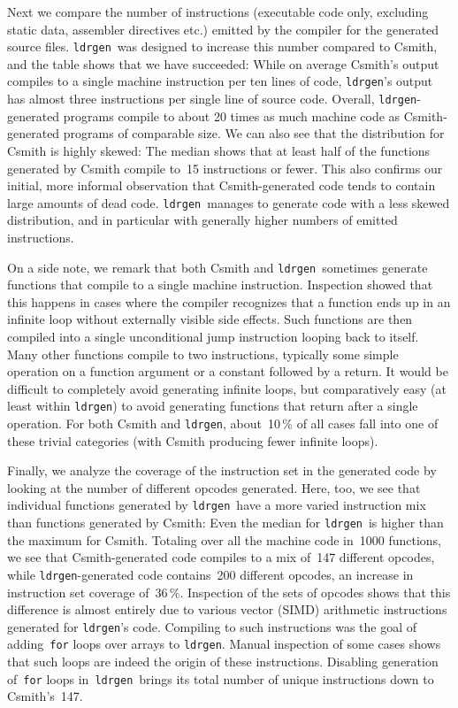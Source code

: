 \documentclass{llncs}
\newcommand\ldrgen{\texttt{ldrgen}}
\begin{document}
Next we compare the number of instructions (executable code only, excluding
static data, assembler directives etc.) emitted by the compiler for the
generated source files. \ldrgen\ was designed to increase this number
compared to Csmith, and the table shows that we have succeeded: While on
average Csmith's output compiles to a single machine instruction per ten
lines of code, \ldrgen's output has almost three instructions per single
line of source code. Overall, \ldrgen-generated programs compile to about 20
times as much machine code as Csmith-generated programs of comparable size.
We can also see that the distribution for Csmith is highly skewed: The
median shows that at least half of the functions generated by Csmith compile
to~15 instructions or fewer. This also confirms our initial, more informal
observation that Csmith-generated code tends to contain large amounts of
dead code. \ldrgen\ manages to generate code with a less skewed
distribution, and in particular with generally higher numbers of emitted
instructions.

On a side note, we remark that both Csmith and \ldrgen\ sometimes generate
functions that compile to a single machine instruction. Inspection showed
that this happens in cases where the compiler recognizes that a function
ends up in an infinite loop without externally visible side effects. Such
functions are then compiled into a single unconditional jump instruction
looping back to itself. Many other functions compile to two instructions,
typically some simple operation on a function argument or a constant
followed by a return. It would be difficult to completely avoid generating
infinite loops, but comparatively easy (at least within \ldrgen) to avoid
generating functions that return after a single operation. For both Csmith
and \ldrgen, about~10\,\% of all cases fall into one of these trivial
categories (with Csmith producing fewer infinite loops).

Finally, we analyze the coverage of the instruction set in the generated
code by looking at the number of different opcodes generated. Here, too, we
see that individual functions generated by \ldrgen\ have a more varied
instruction mix than functions generated by Csmith: Even the median for
\ldrgen\ is higher than the maximum for Csmith. Totaling over all the
machine code in~1000 functions, we see that Csmith-generated code compiles
to a mix of~147 different opcodes, while \ldrgen-generated code contains~200
different opcodes, an increase in instruction set coverage of~36\,\%.
Inspection of the sets of opcodes shows that this difference is almost
entirely due to various vector (SIMD) arithmetic instructions generated for
\ldrgen's code. Compiling to such instructions was the goal of
adding~\verb|for| loops over arrays to \ldrgen.  Manual inspection of some
cases shows that such loops are indeed the origin of these instructions.
Disabling generation of~\verb|for| loops in~\ldrgen\ brings its total number
of unique instructions down to Csmith's~147.
\end{document}
